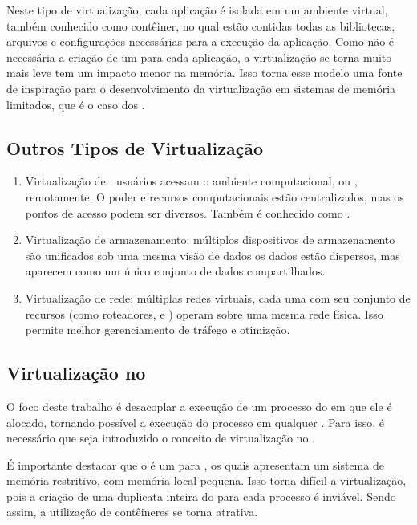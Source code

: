Neste tipo de virtualização, cada aplicação é isolada em um ambiente virtual, também conhecido como contêiner, no qual estão contidas todas as bibliotecas, arquivos e configurações necessárias para a execução da aplicação. Como não é necessária a criação de um \so para cada aplicação, a virtualização se torna muito mais leve \ie tem um impacto menor na memória. Isso torna esse modelo uma fonte de inspiração para o desenvolvimento da virtualização em sistemas de memória limitados, que é o caso dos \lws.

\subsection{Outros Tipos de Virtualização}
\begin{enumerate}[label=(\roman*)]
    \item Virtualização de \desktop: usuários acessam o ambiente computacional, ou \desktop, remotamente. O poder e recursos computacionais estão centralizados, mas os pontos de acesso podem ser diversos. Também é conhecido como \vdi.
    \item Virtualização de armazenamento: múltiplos dispositivos de armazenamento são unificados sob uma mesma visão de dados \ie os dados estão dispersos, mas aparecem como um único conjunto de dados compartilhados.
    \item Virtualização de rede: múltiplas redes virtuais, cada uma com seu conjunto de recursos (como roteadores, \switches e \firewalls) operam sobre uma mesma rede física. Isso permite melhor gerenciamento de tráfego e otimizção.
\end{enumerate}

\subsection{Virtualização no \nanvix}

O foco deste trabalho é desacoplar a execução de um processo do \cluster em que ele é alocado, tornando possível a execução do processo em qualquer \cluster. Para isso, é necessário que seja introduzido o conceito de virtualização no \nanvix.

É importante destacar que o \nanvix é um \so para \lws, os quais apresentam um sistema de memória restritivo, com memória local pequena. Isso torna difícil a virtualização, pois a criação de uma duplicata inteira do \so para cada processo é inviável. Sendo assim, a utilização de contêineres se torna atrativa. 

